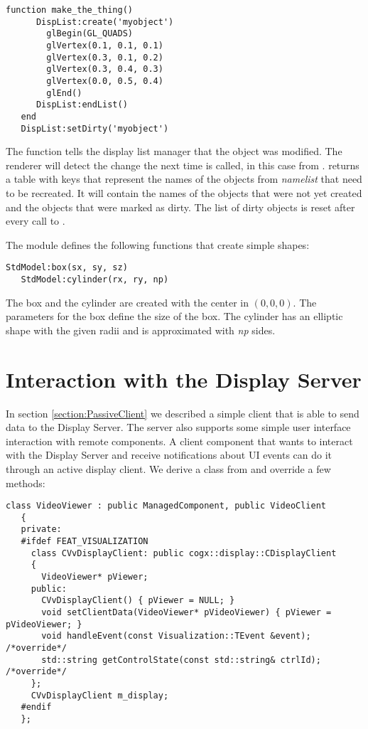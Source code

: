\begin{Verbatim}[fontsize=\scriptsize,gobble=3]
   function make_the_thing()
      DispList:create('myobject')
        glBegin(GL_QUADS)
        glVertex(0.1, 0.1, 0.1)
        glVertex(0.3, 0.1, 0.2)
        glVertex(0.3, 0.4, 0.3)
        glVertex(0.0, 0.5, 0.4)
        glEnd()
      DispList:endList()
   end
   DispList:setDirty('myobject')
\end{Verbatim}

The function  tells the display list manager that the object
was modified. The renderer will detect the change the next time
 is called, in this case from .
 returns a table with keys that represent the names of
the objects from {\em namelist} that need to be recreated. It will contain the
names of the objects that were not yet created and the objects that were marked
as dirty. The list of dirty objects is reset after every call to
.

The module  defines the following functions that create simple shapes:

\begin{Verbatim}[fontsize=\scriptsize,gobble=3]
   StdModel:box(sx, sy, sz)
   StdModel:cylinder(rx, ry, np)
\end{Verbatim}

The box and the cylinder are created with the center in $(0, 0, 0)$. The
parameters for the box define the size of the box. The cylinder has an elliptic
shape with the given radii and is approximated with {\em np} sides.



\section{Interaction with the Display Server}

In section \ref{section:PassiveClient} we described a simple client that is
able to send data to the Display Server. The server also supports some simple
user interface interaction with remote components. A client component that
wants to interact with the Display Server and receive notifications about UI
events can do it through an active display client. We derive a class from
 and override a few methods:

\begin{Verbatim}[fontsize=\scriptsize,gobble=3]
   class VideoViewer : public ManagedComponent, public VideoClient
   {
   private:
   #ifdef FEAT_VISUALIZATION
     class CVvDisplayClient: public cogx::display::CDisplayClient
     {
       VideoViewer* pViewer;
     public:
       CVvDisplayClient() { pViewer = NULL; }
       void setClientData(VideoViewer* pVideoViewer) { pViewer = pVideoViewer; }
       void handleEvent(const Visualization::TEvent &event); /*override*/
       std::string getControlState(const std::string& ctrlId); /*override*/
     };
     CVvDisplayClient m_display;
   #endif
   };
\end{Verbatim}

